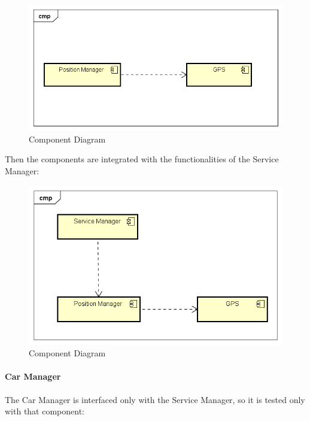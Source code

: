 \begin{figure}[H]	
	\centering
	\includegraphics[width=\textwidth]{img/PosMan_GPS_int}
	\caption{Component Diagram}
\end{figure}
Then the components are integrated with the functionalities of the Service Manager:

\begin{figure}[H]	
	\centering
	\includegraphics[width=\textwidth]{img/PosMan_SrvMan_int}
	\caption{Component Diagram}
\end{figure}

\paragraph{Car Manager}
The Car Manager is interfaced only with the Service Manager, so it is tested only with that component:

